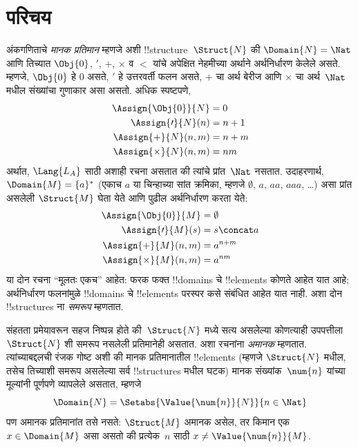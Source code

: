 \documentclass[../../../include/open-logic-section]{subfiles}
\begin{document}
\section{परिचय}

अंकगणिताचे \emph{मानक प्रतिमान} म्हणजे अशी !!{structure}~$\Struct{N}$ की
$\Domain{N} = \Nat$ आणि तिच्यात $\Obj{0}$, $\prime$, $+$, $\times$ व
$<$ यांचे अपेक्षित नेहमीच्या अर्थाने अर्थनिर्धारण केलेले असते. म्हणजे,
$\Obj{0}$ हे $0$ असते, $\prime$ हे उत्तरवर्ती फलन असते, $+$ चा अर्थ
बेरीज आणि $\times$ चा अर्थ~$\Nat$ मधील संख्यांचा गुणाकार असा असतो.
अधिक स्पष्टपणे,
\begin{align*}
  \Assign{\Obj{0}}{N} & = 0\\
  \Assign{\prime}{N}(n) & = n + 1\\
  \Assign{+}{N}(n, m) & = n + m\\
  \Assign{\times}{N}(n, m) & = nm
\end{align*}
अर्थात, $\Lang{L_A}$ साठी अशाही रचना असतात की त्यांचे प्रांत~$\Nat$
नसतात. उदाहरणार्थ, $\Domain{M} = \{a\}^*$ (एकाच $a$ या चिन्हाच्या
सांत क्रमिका, म्हणजे $\emptyset$, $a$, $aa$, $aaa$, \dots) असा प्रांत
असलेली $\Struct{M}$ घेता येते आणि पुढील अर्थनिर्धारण करता येते:
\begin{align*}
  \Assign{\Obj{0}}{M} & = \emptyset\\
  \Assign{\prime}{M}(s) & = s \concat a\\
  \Assign{+}{M}(n, m) & = a^{n + m}\\
  \Assign{\times}{M}(n, m) & = a^{nm}
\end{align*}
या दोन रचना ``मूलतः एकच'' आहेत: फरक फक्त !!{domain}s चे
!!{element}s कोणते आहेत यात आहे; अर्थनिर्धारण फलनांमुळे !!{domain}s चे
!!{element}s परस्पर कसे संबंधित आहेत यात नाही. अशा दोन !!{structure}s ना
\emph{समरूप} म्हणतात.

संहतता प्रमेयावरून सहज निष्पन्न होते की~$\Struct{N}$ मध्ये सत्य असलेल्या
कोणत्याही उपपत्तीला~$\Struct{N}$ शी समरूप नसलेली प्रतिमानेही असतात. अशा
रचनांना \emph{अमानक} म्हणतात. त्यांच्याबद्दलची रंजक गोष्ट अशी की मानक
प्रतिमानातील !!{element}s (म्हणजे $\Struct{N}$ मधील, तसेच तिच्याशी समरूप
असलेल्या सर्व !!{structure}s मधील घटक) मानक संख्यांक~$\num{n}$ यांच्या
मूल्यांनी पूर्णपणे व्यापलेले असतात, म्हणजे
\[
\Domain{N} = \Setabs{\Value{\num{n}}{N}}{n \in \Nat}
\]
पण अमानक प्रतिमानांत तसे नसते: $\Struct{M}$ अमानक असेल, तर किमान एक
$x \in \Domain{M}$ असा असतो की प्रत्येक~$n$ साठी
$x \neq \Value{\num{n}}{M}$.
\end{document}
